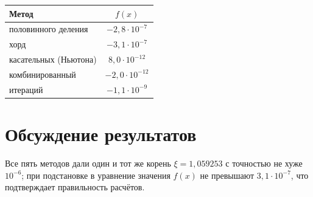 \documentclass[14pt,a4paper]{extarticle}
\begin{document}
\begin{table}[H]
    \centering
    \begin{tabular}{@{}lc@{}}
        \toprule
        Метод & $f(x)$ \\
        \midrule
        половинного деления & $-2{,}8\cdot10^{-7}$\\
        хорд                & $-3{,}1\cdot10^{-7}$\\
        касательных (Ньютона) & $8{,}0\cdot10^{-12}$\\
        комбинированный     & $-2{,}0\cdot10^{-12}$\\
        итераций            & $-1{,}1\cdot10^{-9}$\\
        \bottomrule
    \end{tabular}
\end{table}

\section{Обсуждение результатов}

Все пять методов дали один и тот же корень
$\xi = 1{,}059253$ с точностью не хуже $10^{-6}$; при подстановке в
уравнение значения $f(x)$ не превышают $3{,}1\cdot10^{-7}$, что
подтверждает правильность расчётов.
\end{document}
